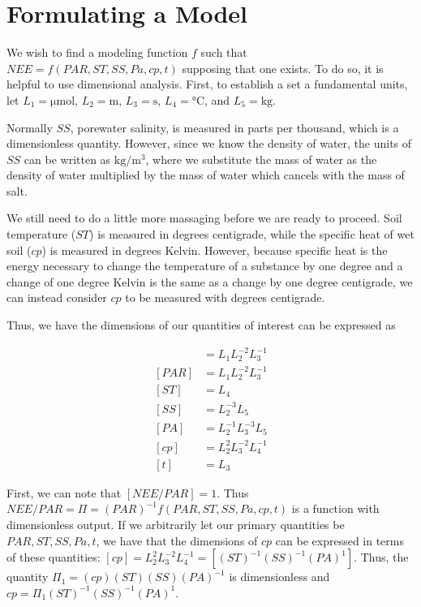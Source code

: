 \documentclass{article}
\begin{document}
\section{Formulating a Model}

We wish to find a modeling function $f$ such that $NEE = f(PAR,ST,SS,Pa,cp,t)$ supposing that one exists. To do so, it is helpful to use dimensional analysis. First, to establish a set a fundamental units, let $L_1 = \si{\micro \mole}$, $L_2 = \si{\meter}$, $L_3 = \si{\second}$, $L_4 = \si{\celsius}$, and $L_5 = \si{\kilo \gram}$.\medskip

Normally $SS$, porewater salinity, is measured in parts per thousand, which is a dimensionless quantity. However, since we know the density of water, the units of $SS$ can be written as $\si{\kilogram \per \meter^3}$, where we substitute the mass of water as the density of water multiplied by the mass of water which cancels with the mass of salt.\medskip

We still need to do a little more massaging before we are ready to proceed. Soil temperature ($ST$) is measured in degrees centigrade, while the specific heat of wet soil ($cp$) is measured in degrees Kelvin. However, because specific heat is the energy necessary to change the temperature of a substance by one degree and a change of one degree Kelvin is the same as a change by one degree centigrade, we can instead consider $cp$ to be measured with degrees centigrade. \medskip

Thus, we have the dimensions of our quantities of interest can be expressed as

\begin{align*}
    [NEE] &= L_1L_2^{-2}L_3^{-1}\\
    [PAR] &= L_1L_2^{-2}L_3^{-1}\\
    [ST]  &= L_4\\
    [SS]  &= L_2^{-3}L_5\\
    [PA]  &= L_2^{-1}L_3^{-3}L_5\\
    [cp]  &= L_2^2L_3^{-2}L_4^{-1}\\
    [t]  &= L_3
\end{align*}

First, we can note that $[NEE/PAR] = 1$. Thus $NEE/PAR = \Pi = (PAR)^{-1}f(PAR,ST,SS,Pa,cp,t)$ is a function with dimensionless output. If we arbitrarily let our primary quantities be $PAR,ST,SS,Pa,t$, we have that the dimensions of $cp$ can be expressed in terms of these quantities: $[cp] = L_2^2L_3^{-2}L_4^{-1} = [(ST)^{-1}(SS)^{-1}(PA)^{1}]$. Thus, the quantity $\Pi_1 = (cp)(ST)(SS)(PA)^{-1}$ is dimensionless and $cp = \Pi_1(ST)^{-1}(SS)^{-1}(PA)^{1}$.\medskip
\end{document}
